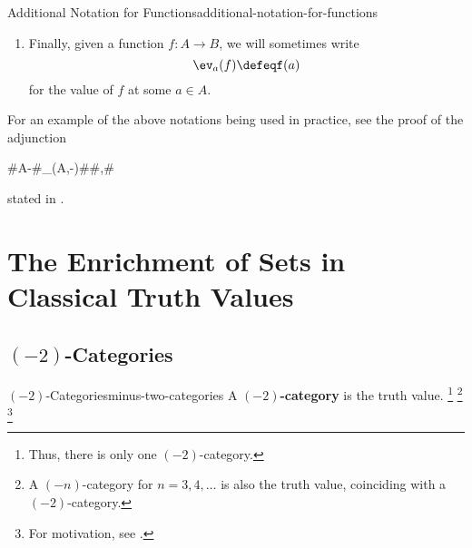 \begin{notation}{Additional Notation for Functions}{additional-notation-for-functions}
\begin{enumerate}
\begin{enumerate}
            \end{enumerate}
        \item\label{additional-notation-for-functions-4}Finally, given a function $f\colon A\to B$, we will sometimes write
            \[
                \ev_{a}(f)%
                \defeq%
                f(a)%
            \]%
            for the value of $f$ at some $a\in A$.
    \end{enumerate}
    For an example of the above notations being used in practice, see the proof of the adjunction
    \begin{webcompile}
        \AdjunctionShort#A\times -#{\Hom_{\Sets}(A,-)}#\Sets#\Sets,#
    \end{webcompile}
    stated in .
\end{notation}
\section{The Enrichment of Sets in Classical Truth Values}\label{section-the-enrichment-of-sets-in-classical-truth-values}
\subsection{$(-2)$-Categories}\label{subsection-minus-two-categories}
\begin{definition}{$(-2)$-Categories}{minus-two-categories}%
    A \textbf{$(-2)$-category} is the  truth value.%
    \footnote{%
        Thus, there is only one $(-2)$-category.
    }%
    \footnote{%
        A $(-n)$-category for $n=3,4,\ldots$ is also the  truth value, coinciding with a $(-2)$-category.
    }%
    \footnote{%
        For motivation, see \cite[p.~13]{lectures-on-n-categories-and-cohomology}.
        \par\vspace*{\TCBBoxCorrection}
    }%
\end{definition}
